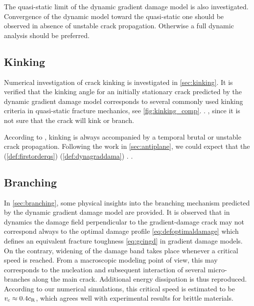 The quasi-static limit of the dynamic gradient damage model is also investigated. Convergence of the dynamic model toward the quasi-static one should be observed in absence of unstable crack propagation. Otherwise a full dynamic analysis should be preferred.

\subsection{Kinking}
Numerical investigation of crack kinking is investigated in \cref{sec:kinking}. It is verified that the kinking angle for an initially stationary crack predicted by the dynamic gradient damage model corresponds to several commonly used kinking criteria in quasi-static fracture mechanics, see \cref{fig:kinking_comp}. . , since it is not sure that the crack will kink or branch.

According to \cite{ChambolleFrancfortMarigo:2009}, kinking is always accompanied by a temporal brutal or unstable crack propagation. Following the work in \cref{sec:antiplane}, we could expect that the  (\cref{def:firstorderqs})  (\cref{def:dynagraddama}) . .

\subsection{Branching}
In \cref{sec:branching}, some physical insights into the branching mechanism predicted by the dynamic gradient damage model are provided. It is observed that in dynamics the damage field perpendicular to the gradient-damage crack may not correspond always to the optimal damage profile \eqref{eq:defoptimaldamage} which defines an equivalent fracture toughness \eqref{eq:gcingd} in gradient damage models. On the contrary, widening of the damage band takes place whenever a critical speed is reached. From a macroscopic modeling point of view, this may corresponds to the nucleation and subsequent interaction of several micro-branches along the main crack. Additional energy dissipation is thus reproduced. According to our numerical simulations, this critical speed is estimated to be $v_{\mathrm{c}}\approx0.4c_\mathrm{R}$, which agrees well with experimental results for brittle materials.

